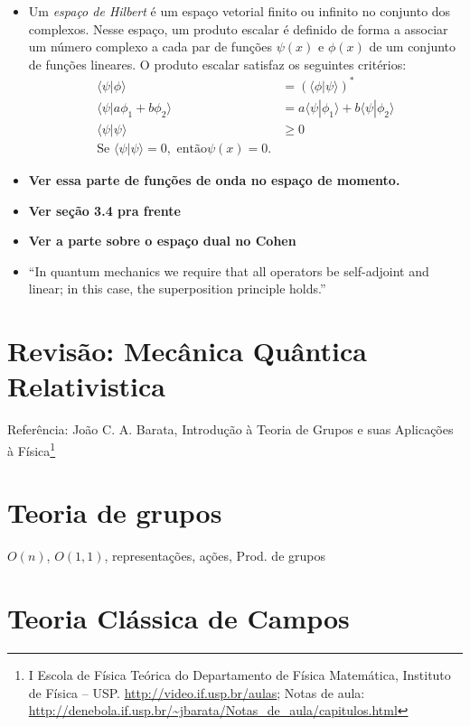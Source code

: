 \begin{itemize}
	\item Um \emph{espaço de Hilbert} é um espaço vetorial finito ou infinito no conjunto dos complexos. Nesse espaço, um produto escalar é definido de forma a associar um número complexo a cada par de funções $\psi(x)$ e $\phi(x)$ de um conjunto de funções lineares. O produto escalar satisfaz os seguintes critérios:
\begin{align}
	\langle\psi|\phi\rangle &= (\langle \phi|\psi\rangle)^* \\
	\langle\psi|a\phi_1 + b\phi_2\rangle &= a\langle\psi|\phi_1\rangle + b\langle\psi|\phi_2\rangle \\
	\langle\psi|\psi\rangle &\geq 0 \\
	\textrm{Se~}\langle\psi|\psi\rangle = 0,\textrm{~então} \psi(x) = 0.
\end{align}
	\item \textbf{Ver essa parte de funções de onda no espaço de momento.}
	\item \textbf{Ver seção 3.4 pra frente}
	\item \textbf{Ver a parte sobre o espaço dual no Cohen}
	\item ``In quantum mechanics we require that all operators be self-adjoint and linear; in this case, the superposition principle holds.''
\end{itemize}

\section{Revisão: Mecânica Quântica Relativistica}

Referência: João C. A. Barata, Introdução à Teoria de Grupos e suas Aplicações à Física\footnote{I Escola de Física Teórica do Departamento de Física Matemática, Instituto de Física -- USP. \url{http://video.if.usp.br/aulas}; Notas de aula: \url{http://denebola.if.usp.br/~jbarata/Notas_de_aula/capitulos.html}}

\section{Teoria de grupos}

$O(n)$, $O(1,1)$, representações, ações, Prod. de grupos

\section{Teoria Clássica de Campos}


